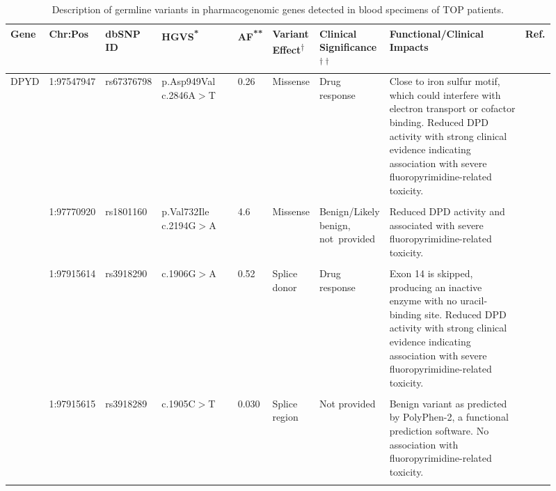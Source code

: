 \begin{landscape}

\begin{longtable}{p{0.07\linewidth}|p{0.09\linewidth}p{0.085\linewidth}p{0.14\linewidth}p{0.05\linewidth}p{0.065\linewidth}p{0.11\linewidth}p{0.25\linewidth}p{0.05\linewidth}}
	\caption{Description of germline variants in pharmacogenomic genes detected in blood specimens of TOP patients.}
	\label{tbl:germline_pgx_genes}
	\\
	\hline
	Gene & Chr:Pos & dbSNP ID & HGVS\textsuperscript{*} & AF\textsuperscript{**} & Variant Effect\textsuperscript{$\dagger$} & Clinical Significance\textsuperscript{$\dagger\dagger$} & Functional/Clinical Impacts & Ref.
	\\
	\hline
	DPYD & 1:97547947 & rs67376798 & p.Asp949Val c.2846A$>$T & 0.26 & Missense & Drug response
	&
	 Close to iron sulfur motif, which could interfere with electron transport or cofactor binding. Reduced DPD activity with strong clinical evidence indicating association with severe fluoropyrimidine-related toxicity.
	&
	\cite{VanKuilenburg2016, Toffoli2015, Lee2014, Deenen2011, Kuilenburg2000, Swen2011, Caudle2013, Amstutz2009, Schwab2008, Morel2006, Mattison2002, Dobritzsch2001, Boige2016, Offer2014, Meulendijks2015}
	\\
	\\
	& 1:97770920 & rs1801160 & p.Val732Ile c.2194G$>$A & 4.6 & Missense & Benign/Likely benign, \mbox{not provided} & Reduced DPD activity and associated with severe fluoropyrimidine-related toxicity. & \cite{Schwab2008, Kuilenburg2000, Gentile2016, Deenen2011, Boige2016, VanKuilenburg2016}
	\\
	\\
	& 1:97915614 & rs3918290 & c.1906G$>$A & 0.52 & Splice donor & Drug response & Exon 14 is skipped, producing an inactive enzyme with no uracil-binding site. Reduced DPD activity with strong clinical evidence indicating association with severe fluoropyrimidine-related toxicity. & \cite{Toffoli2015, Lee2014, Caudle2013, Swen2011, Kuilenburg2000, Deenen2011, Amstutz2009, Schwab2008, Morel2006, Gentile2016, VanKuilenburg2016, Meulendijks2015}
	\\
	\\
	& 1:97915615 & rs3918289 & c.1905C$>$T & 0.030 & Splice region & Not provided & Benign variant as predicted by PolyPhen-2, a functional prediction software. No association with fluoropyrimidine-related toxicity. & \cite{Boige2016, Offer2014}
	\\
	\\

\end{longtable}
\end{landscape}
